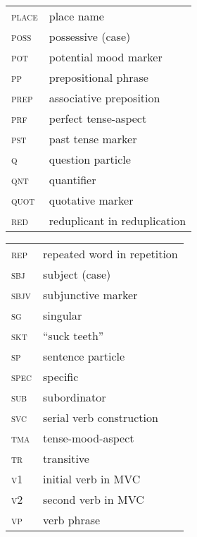 \newpage 
\begin{tabularx}{.45\textwidth}{lQ}
\textsc{place} & place name\\
\textsc{poss} & possessive (case)\\
\textsc{pot} & potential mood marker\\
\textsc{pp} & prepositional phrase\\
\textsc{prep} & associative preposition\\
\textsc{prf} & perfect tense-aspect\\
\textsc{pst} & past tense marker\\
\textsc{q} & question particle\\
\textsc{qnt} & quantifier\\
\textsc{quot} & quotative marker\\
\textsc{red} & reduplicant in reduplication\\
\end{tabularx}
\begin{tabularx}{.45\textwidth}{lQ}
\textsc{rep} & repeated word in repetition\\
\textsc{sbj} & subject (case)\\
\textsc{sbjv} & subjunctive marker\\
\textsc{sg} & singular\\
\textsc{skt} & “suck teeth”\\
\textsc{sp} & sentence particle\\
\textsc{spec} & specific\\
\textsc{sub} & subordinator\\
\textsc{svc} & serial verb construction\\
\textsc{tma} & tense-mood-aspect\\
\textsc{tr} & transitive\\
\textsc{v1} & initial verb in \textsc{MVC}\\
\textsc{v2} & second verb in \textsc{MVC}\\
\textsc{vp} & verb phrase\\
\end{tabularx}